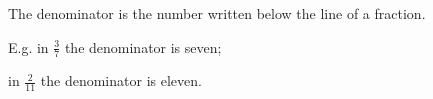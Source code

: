 The denominator is the number written below the line of a fraction.
\par
E.g. in $ \frac{3}{7} $ the denominator is seven; 
\par
in $ \frac{2}{11} $ the denominator is eleven.